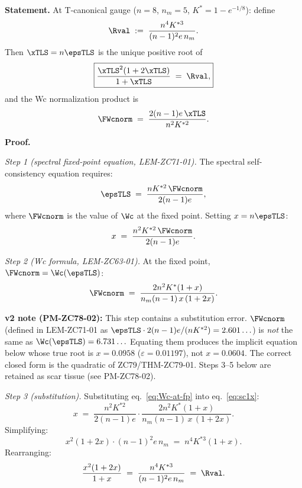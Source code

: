 \documentclass[12pt, a4paper]{article}
\begin{document}
\begin{formalbox}[title={THM-ZC78-01: Wc Floor Theorem ($R_0$, Exact)}]

\textbf{Statement.}
At T-canonical gauge ($n=8$, $n_m=5$, $K^*=1-e^{-1/8}$):
define
\begin{equation}
  \Rval \;:=\; \frac{n^4 K^{*3}}{(n-1)^2 e\, n_m}.
  \label{eq:Rval}
\end{equation}
Then $\xTLS = n\epsTLS$ is the unique positive root of
\begin{equation}
  \boxed{
    \frac{\xTLS^{2}(1+2\xTLS)}{1+\xTLS} \;=\; \Rval,
  }
  \label{eq:implicit}
\end{equation}
and the Wc normalization product is
\begin{equation}
  \FWcnorm \;=\; \frac{2(n-1)e\,\xTLS}{n^2 K^{*2}}.
  \label{eq:FWcnorm}
\end{equation}

\textbf{Proof.}

\textit{Step 1 (spectral fixed-point equation, LEM-ZC71-01).}
The spectral self-consistency equation requires:
\begin{equation}
  \epsTLS \;=\; \frac{n K^{*2}\,\FWcnorm}{2(n-1)e},
  \label{eq:sc1}
\end{equation}
where $\FWcnorm$ is the value of $\Wc$ at the fixed point.
Setting $x = n\epsTLS$:
\begin{equation}
  x \;=\; \frac{n^2 K^{*2}\,\FWcnorm}{2(n-1)e}.
  \label{eq:sc1x}
\end{equation}

\textit{Step 2 (Wc formula, LEM-ZC63-01).}
At the fixed point, $\FWcnorm = \Wc(\epsTLS)$:
\begin{equation}
  \FWcnorm
  \;=\;
  \frac{2n^2 K^*(1+x)}{n_m(n-1)\,x\,(1+2x)}.
  \label{eq:Wc-at-fp}
\end{equation}

\textbf{v2 note (PM-ZC78-02):} This step contains a substitution
error. $\FWcnorm$ (defined in LEM-ZC71-01 as
$\epsTLS \cdot 2(n-1)e/(nK^{*2}) = 2.601\ldots$)
is \emph{not} the same as $\Wc(\epsTLS) = 6.731\ldots$
Equating them produces the implicit equation below whose
true root is $x = 0.0958$ ($\varepsilon = 0.01197$),
not $x = 0.0604$.
The correct closed form is the quadratic of ZC79/THM-ZC79-01.
Steps 3--5 below are retained as scar tissue (see PM-ZC78-02).

\textit{Step 3 (substitution).}
Substituting eq.~\eqref{eq:Wc-at-fp} into eq.~\eqref{eq:sc1x}:
\[
  x \;=\;
  \frac{n^2 K^{*2}}{2(n-1)e}
  \cdot
  \frac{2n^2 K^*(1+x)}{n_m(n-1)\,x\,(1+2x)}.
\]
Simplifying:
\[
  x^2(1+2x) \cdot (n-1)^2 e\, n_m
  \;=\;
  n^4 K^{*3}(1+x).
\]
Rearranging:
\[
  \frac{x^2(1+2x)}{1+x} \;=\; \frac{n^4 K^{*3}}{(n-1)^2 e\, n_m} \;=\; \Rval.
\]


\end{formalbox}
\end{document}

